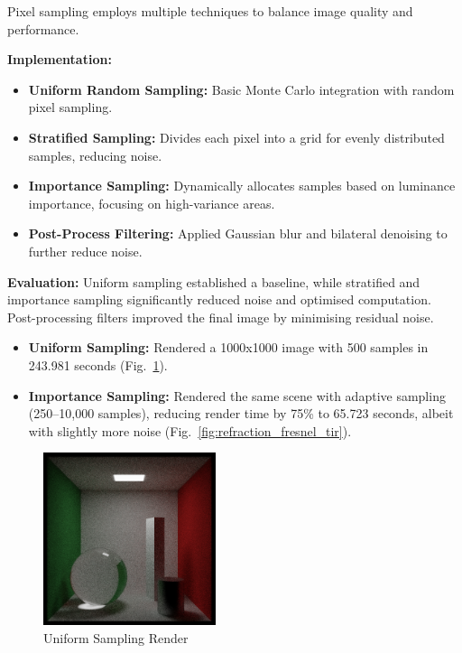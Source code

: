 \documentclass[11pt,a4paper]{article}
\begin{document}
Pixel sampling employs multiple techniques to balance image quality and performance.

\noindent\textbf{Implementation:}  
\begin{itemize}
    \item \textbf{Uniform Random Sampling:} Basic Monte Carlo integration with random pixel sampling.  
    \item \textbf{Stratified Sampling:} Divides each pixel into a grid for evenly distributed samples, reducing noise.  
    \item \textbf{Importance Sampling:} Dynamically allocates samples based on luminance importance, focusing on high-variance areas.  
    \item \textbf{Post-Process Filtering:} Applied Gaussian blur and bilateral denoising to further reduce noise.  
\end{itemize}

\noindent\textbf{Evaluation:}  
Uniform sampling established a baseline, while stratified and importance sampling significantly reduced noise and optimised computation. Post-processing filters improved the final image by minimising residual noise.  

\begin{itemize}
    \item \textbf{Uniform Sampling:} Rendered a 1000x1000 image with 500 samples in 243.981 seconds (Fig.~\ref{fig:basic_refraction}).  
    \item \textbf{Importance Sampling:} Rendered the same scene with adaptive sampling (250–10,000 samples), reducing render time by 75\% to 65.723 seconds, albeit with slightly more noise (Fig.~\ref{fig:refraction_fresnel_tir}).  
\end{itemize}

\begin{figure}[h!]  
    \centering  
    \includegraphics[width=0.45\textwidth]{uniform 500.png}  
    \caption{Uniform Sampling Render}  
    \label{fig:basic_refraction}  
\end{figure}
\end{document}
